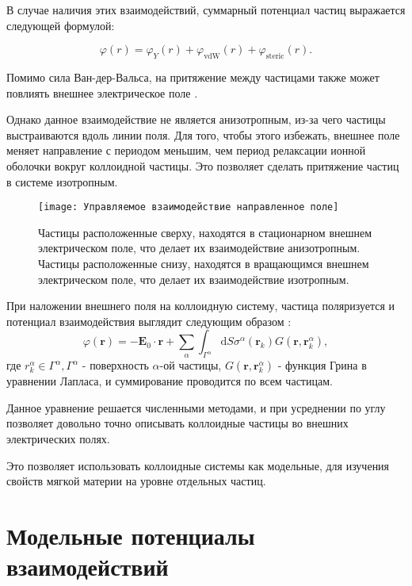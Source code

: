 В случае наличия этих взаимодействий, суммарный потенциал частиц выражается следующей формулой:

\begin{equation}
\varphi(r)=\varphi_{Y}(r)+\varphi_{\mathrm{vdW}}(r)+\varphi_{\mathrm{steric}}(r).
\end{equation}

Помимо сила Ван-дер-Вальса, на притяжение между частицами также может повлиять внешнее электрическое поле \cite{gel6}.

Однако данное взаимодействие не является анизотропным, из-за чего частицы выстраиваются вдоль линии поля. Для того, чтобы этого избежать, внешнее поле меняет направление с периодом меньшим, чем период релаксации ионной оболочки вокруг коллоидной частицы. Это позволяет сделать притяжение частиц в системе изотропным.

\begin{figure}[h]
\begin{center}
\texttt{[image: Управляемое взаимодействие направленное поле]}
\caption{Частицы расположенные сверху, находятся в стационарном внешнем электрическом поле, что делает их взаимодействие анизотропным. Частицы расположенные снизу, находятся в вращающимся  внешнем электрическом поле, что делает их взаимодействие изотропным.}
\label{risPolar}
\end{center}
\end{figure}

При наложении внешнего поля на коллоидную систему, частица поляризуется и потенциал взаимодействия выглядит следующим образом \cite{gel7}:
\begin{equation}
\varphi(\mathbf{r})=-\mathbf{E}_{0} \cdot \mathbf{r}+\sum_{\alpha} \int_{\Gamma^{\alpha}} \mathrm{d} S \sigma^{\alpha}\left(\mathbf{r}_{k}\right) G\left(\mathbf{r}, \mathbf{r}_{k}^{\alpha}\right),
\end{equation}
где $r_{k}^{\alpha} \in \Gamma^\alpha, \Gamma^\alpha$ - поверхность $\alpha$-ой частицы, $G\left(\mathbf{r}, \mathbf{r}_{k}^{\alpha}\right)$ - функция Грина в уравнении Лапласа, и суммирование проводится по всем частицам.

Данное уравнение решается численными методами, и при усреднении по углу позволяет довольно точно описывать коллоидные частицы во внешних электрических полях.

Это позволяет использовать коллоидные системы как модельные, для изучения свойств мягкой материи на уровне отдельных частиц. 

\section{Модельные потенциалы взаимодействий}

